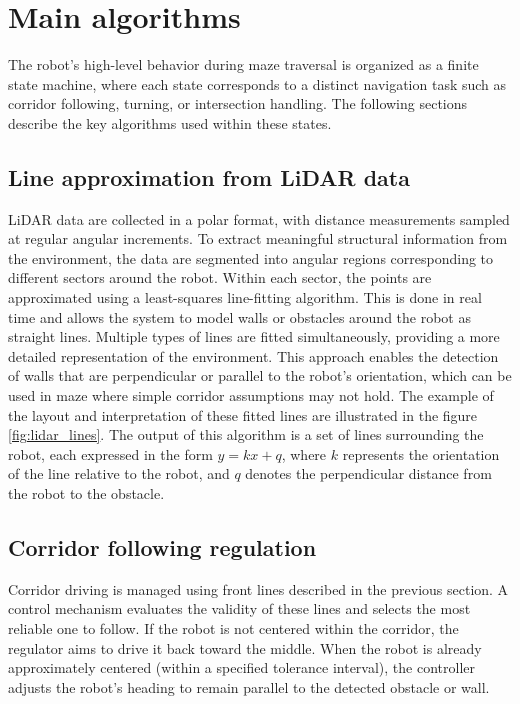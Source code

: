 
\section{Main algorithms}
The robot’s high-level behavior during maze traversal is organized as a finite state machine, where each state corresponds to a distinct navigation task such as corridor following, turning, or intersection handling. The following sections describe the key algorithms used within these states.

\subsection{Line approximation from LiDAR data}
LiDAR data are collected in a polar format, with distance measurements sampled at regular angular increments. To extract meaningful structural information from the environment, the data are segmented into angular regions corresponding to different sectors around the robot. Within each sector, the points are approximated using a least-squares line-fitting algorithm. This is done in real time and allows the system to model walls or obstacles around the robot as straight lines. Multiple types of lines are fitted simultaneously, providing a more detailed representation of the environment. This approach enables the detection of walls that are perpendicular or parallel to the robot’s orientation, which can be used in maze where simple corridor assumptions may not hold. The example of the layout and interpretation of these fitted lines are illustrated in the figure \ref{fig:lidar_lines}. The output of this algorithm is a set of lines surrounding the robot, each expressed in the form \( y = kx + q \), where \( k \) represents the orientation of the line relative to the robot, and \( q \) denotes the perpendicular distance from the robot to the obstacle.

\subsection{Corridor following regulation}
Corridor driving is managed using front lines described in the previous section. A control mechanism evaluates the validity of these lines and selects the most reliable one to follow. If the robot is not centered within the corridor, the regulator aims to drive it back toward the middle. When the robot is already approximately centered (within a specified tolerance interval), the controller adjusts the robot's heading to remain parallel to the detected obstacle or wall.

